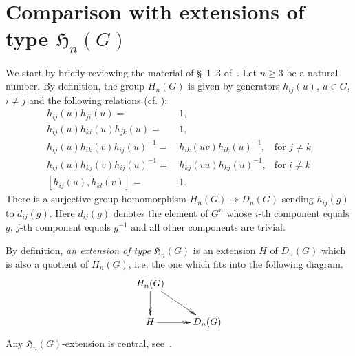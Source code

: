 \documentclass[oneside, 10pt]{amsart}
\theoremstyle{plain}
\numberwithin{equation}{section}
\numberwithin{lemma}{section}
\theoremstyle{remark}
\theoremstyle{definition}
\begin{document}
\section{Comparison with extensions of type \texorpdfstring{$\mathfrak{H}_n(G)$}{Hn(G)}} \label{sec:Hnextensions}
We start by briefly reviewing the material of \S~1--3 of~\cite{Reh78}. 
Let $n \geq 3$ be a natural number. By definition, the group $H_n(G)$ is given by generators
$h_{ij}(u)$, $u\in G$, $i\neq j$ and the following relations (cf. \cite[H1--H5~of~\S~2]{Reh78}):
\begin{align}
h_{ij}(u) h_{ji}(u)                = &\, 1,                        &                     \tag{H1} \label{RH1} \\
h_{ij}(u) h_{ki}(u) h_{jk}(u)      = &\, 1,                        &                     \tag{H2} \label{RH2} \\
h_{ij}(u) h_{ik}(v) h_{ij}(u)^{-1} = &\, h_{ik}(uv) h_{ik}(u)^{-1},& \text{for } j\neq k \tag{H3} \label{RH3} \\
h_{ij}(u) h_{kj}(v) h_{ij}(u)^{-1} = &\, h_{kj}(vu) h_{kj}(u)^{-1},& \text{for } i\neq k \tag{H4} \label{RH4} \\
[h_{ij}(u), h_{kl}(v)]             = &\, 1.                        &                     \tag{H5} \label{RH5} \end{align}
There is a surjective group homomorphism $H_n(G) \twoheadrightarrow D_n(G)$ sending $h_{ij}(g)$ to $d_{ij}(g)$.
Here $d_{ij}(g)$ denotes the element of $G^n$ whose
 $i$-th component equals $g$, $j$-th component equals $g^{-1}$ and all other components are trivial.

By definition, {\it an extension of type $\mathfrak{H}_n(G)$} is an extension $H$ of $D_n(G)$ which is also a quotient of $H_n(G)$, i.\,e. 
 the one which fits into the following diagram.
\[ \xymatrix{ H_n(G) \ar@{->>}[rd] \ar@{->>}[d] & \\ H \ar@{->>}[r] & D_n(G)} \]
Any $\mathfrak{H}_n(G)$-extension is central, see~\cite[Proposition~2.3]{Reh78}.
\end{document}
